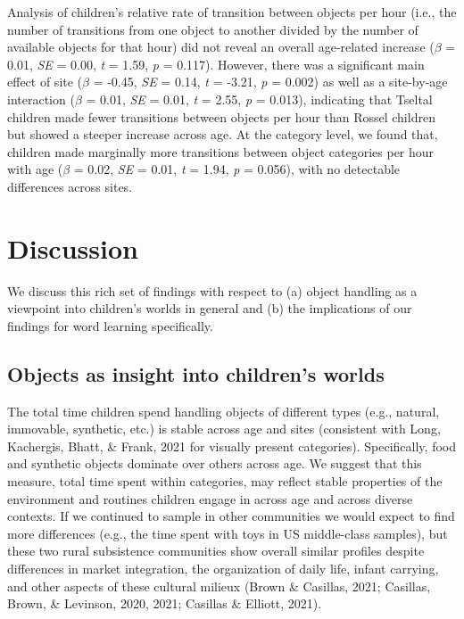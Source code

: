 \documentclass[10pt, letterpaper]{article}
\begin{document}
Analysis of children's relative rate of transition between objects per
hour (i.e., the number of transitions from one object to another divided
by the number of available objects for that hour) did not reveal an
overall age-related increase (\(\beta\) = 0.01, \emph{SE} = 0.00,
\emph{t} = 1.59, \emph{p} = 0.117). However, there was a significant
main effect of site (\(\beta\) = -0.45, \emph{SE} = 0.14, \emph{t} =
-3.21, \emph{p} = 0.002) as well as a site-by-age interaction (\(\beta\)
= 0.01, \emph{SE} = 0.01, \emph{t} = 2.55, \emph{p} = 0.013), indicating
that Tseltal children made fewer transitions between objects per hour
than Rossel children but showed a steeper increase across age. At the
category level, we found that, children made marginally more transitions
between object categories per hour with age (\(\beta\) = 0.02, \emph{SE}
= 0.01, \emph{t} = 1.94, \emph{p} = 0.056), with no detectable
differences across sites.

\hypertarget{discussion}{%
\section{Discussion}\label{discussion}}

We discuss this rich set of findings with respect to (a) object handling
as a viewpoint into children's worlds in general and (b) the
implications of our findings for word learning specifically.

\hypertarget{objects-as-insight-into-childrens-worlds}{%
\subsection{Objects as insight into children's
worlds}\label{objects-as-insight-into-childrens-worlds}}

The total time children spend handling objects of different types (e.g.,
natural, immovable, synthetic, etc.) is stable across age and sites
(consistent with Long, Kachergis, Bhatt, \& Frank, 2021 for visually
present categories). Specifically, food and synthetic objects dominate
over others across age. We suggest that this measure, total time spent
within categories, may reflect stable properties of the environment and
routines children engage in across age and across diverse contexts. If
we continued to sample in other communities we would expect to find more
differences (e.g., the time spent with toys in US middle-class samples),
but these two rural subsistence communities show overall similar
profiles despite differences in market integration, the organization of
daily life, infant carrying, and other aspects of these cultural milieux
(Brown \& Casillas, 2021; Casillas, Brown, \& Levinson, 2020, 2021;
Casillas \& Elliott, 2021).
\end{document}
